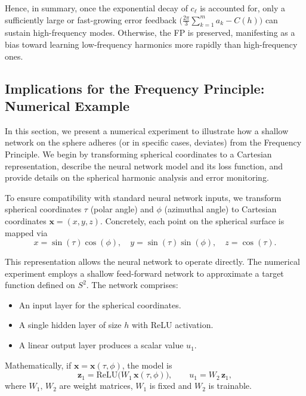 \documentclass[review,onefignum,onetabnum,onealgnum]{siamart250106}
\numberwithin{theorem}{section}
\begin{document}
\noindent
Hence, in summary, once the exponential decay of $c_{\ell}$ is accounted for, only a sufficiently 
large or fast-growing error feedback \(\bigl(\tfrac{2\pi}{3}\sum_{k=1}^m a_k - C(h)\bigr)\) can 
sustain high-frequency modes.  Otherwise, the FP is preserved, manifesting as a bias toward learning 
low-frequency harmonics more rapidly than high-frequency ones.











\subsection{Implications for the Frequency Principle: Numerical Example}
\label{NumericalExampleFixedweight}

In this section, we present a numerical experiment to illustrate how a shallow network on the sphere adheres (or in specific cases, deviates) from the Frequency Principle. We begin by transforming spherical coordinates to a Cartesian representation, describe the neural network model and its loss function, and provide details on the spherical harmonic analysis and error monitoring.

To ensure compatibility with standard neural network inputs, we transform spherical coordinates \(\tau\) (polar angle) and \(\phi\) (azimuthal angle) to Cartesian coordinates \(\mathbf{x} = (x, y, z)\). Concretely, each point on the spherical surface is mapped via
\[
    x = \sin(\tau)\cos(\phi), 
    \quad
    y = \sin(\tau)\sin(\phi), 
    \quad
    z = \cos(\tau).
\]

This representation allows the neural network to operate directly. The numerical experiment employs a shallow feed-forward network to approximate a target function defined on \(S^2\). The network comprises:
\begin{itemize}
    \item An input layer for the spherical coordinates.
    \item A single hidden layer of size \(h\) with ReLU activation.
    \item A linear output layer produces a scalar value \(u_1\).
\end{itemize}

Mathematically, if \(\mathbf{x} = \mathbf{x}(\tau, \phi)\), the model is
\[
    \mathbf{z}_1 
    = \mathrm{ReLU}\!\bigl(W_1\,\mathbf{x}(\tau, \phi)\bigr), 
    \qquad
    u_1 
    = W_2\,\mathbf{z}_1,
\]
where \(W_1,\,W_2\) are weight matrices, $W_1$ is fixed and $W_2$ is trainable.
\end{document}

